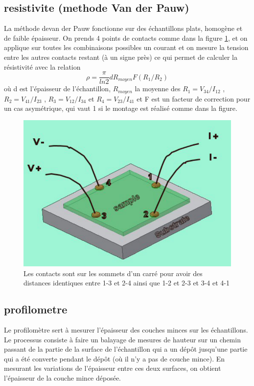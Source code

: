 \documentclass[a4paper,12pt,oneside]{article}
\def \be {\begin{equation}}
\def \ee {\end{equation}}
\begin{document}
\subsection{resistivite (methode Van der Pauw)}
	La méthode devan der Pauw fonctionne sur des échantillons plats, homogène et de faible épaisseur. On prends 4 points de contacts comme dans la figure \ref{fig:illustration_van_der_pauw}, et on applique sur toutes les combinaisons possibles un courant et on mesure la tension entre les autres contacts restant (à un signe près) ce qui permet de calculer la résistivité avec la relation
	\be
		\rho = \frac{\pi}{ln 2} d R_{moyen}  F(R_1/R_2)
	\ee
	où d est l'épaisseur de l'échantillon, $R_{moyen}$ la moyenne des $R_1=V_{34}/I_{12}$ , $R_2=V_{41}/I_{23}$ , $R_3=V_{12}/I_{34}$ et $R_4=V_{23}/I_{41}$ et F est un facteur de correction pour un cas asymétrique, qui vaut 1 si le montage est réalisé comme dans la figure.
		\begin{figure}[h!]
			\begin{center}
			\includegraphics[width=.5\linewidth,angle=0]{./figures/illustration_van_der_pauw.png}
			\caption{Les contacts sont sur les sommets d'un carré pour avoir des distances identiques entre 1-3 et 2-4 ainsi que 1-2 et 2-3 et 3-4 et 4-1} \label{fig:illustration_van_der_pauw}
			\end{center}
		\end{figure}

\subsection{profilometre}
	Le profilomètre sert à mesurer l'épaisseur des couches minces sur les échantillons. Le processus consiste à faire un balayage de mesures de hauteur sur un chemin passant de la partie de la surface de l'échantillon qui a un dépôt jusqu'une partie qui a été converte pendant le dépôt (où il n'y a pas de couche mince). En mesurant les variations de l'épaisseur entre ces deux surfaces, on obtient l'épaisseur de la couche mince déposée.
\end{document}

